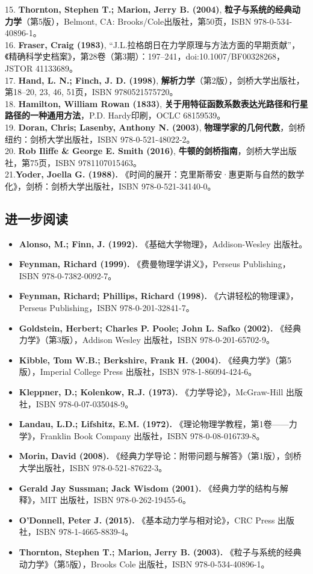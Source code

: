 15. \textbf{Thornton, Stephen T.; Marion, Jerry B. (2004)}, \textbf{粒子与系统的经典动力学}（第5版），Belmont, CA: Brooks/Cole出版社，第50页，ISBN 978-0-534-40896-1。\\
16. \textbf{Fraser, Craig (1983)}, “J.L.拉格朗日在力学原理与方法方面的早期贡献”，《精确科学史档案》，第28卷（第3期）：197–241，doi:10.1007/BF00328268，JSTOR 41133689。\\
17. \textbf{Hand, L. N.; Finch, J. D. (1998)}, \textbf{解析力学}（第2版），剑桥大学出版社，第18–20, 23, 46, 51页，ISBN 9780521575720。\\
18. \textbf{Hamilton, William Rowan (1833)}, \textbf{关于用特征函数系数表达光路径和行星路径的一种通用方法}，P.D. Hardy印刷，OCLC 68159539。\\
19. \textbf{Doran, Chris; Lasenby, Anthony N. (2003)}, \textbf{物理学家的几何代数}，剑桥纽约：剑桥大学出版社，ISBN 978-0-521-48022-2。\\
20. \textbf{Rob Iliffe & George E. Smith (2016)}, \textbf{牛顿的剑桥指南}，剑桥大学出版社，第75页，ISBN 9781107015463。\\
21.\textbf{Yoder, Joella G. (1988). }《时间的展开：克里斯蒂安·惠更斯与自然的数学化》，剑桥：剑桥大学出版社，ISBN 978-0-521-34140-0。
\subsection{进一步阅读}
\begin{itemize}
\item \textbf{Alonso, M.; Finn, J. (1992).} 《基础大学物理》，Addison-Wesley 出版社。
\item \textbf{Feynman, Richard (1999).} 《费曼物理学讲义》，Perseus Publishing，ISBN 978-0-7382-0092-7。
\item \textbf{Feynman, Richard; Phillips, Richard (1998).} 《六讲轻松的物理课》，Perseus Publishing，ISBN 978-0-201-32841-7。
\item \textbf{Goldstein, Herbert; Charles P. Poole; John L. Safko (2002).} 《经典力学》（第3版），Addison Wesley 出版社，ISBN 978-0-201-65702-9。
\item \textbf{Kibble, Tom W.B.; Berkshire, Frank H. (2004).} 《经典力学》（第5版），Imperial College Press 出版社，ISBN 978-1-86094-424-6。
\item \textbf{Kleppner, D.; Kolenkow, R.J. (1973).} 《力学导论》，McGraw-Hill 出版社，ISBN 978-0-07-035048-9。
\item \textbf{Landau, L.D.; Lifshitz, E.M. (1972).} 《理论物理学教程，第1卷——力学》，Franklin Book Company 出版社，ISBN 978-0-08-016739-8。
\item \textbf{Morin, David (2008).} 《经典力学导论：附带问题与解答》（第1版），剑桥大学出版社，ISBN 978-0-521-87622-3。
\item \textbf{Gerald Jay Sussman; Jack Wisdom (2001).} 《经典力学的结构与解释》，MIT 出版社，ISBN 978-0-262-19455-6。
\item \textbf{O'Donnell, Peter J. (2015).} 《基本动力学与相对论》，CRC Press 出版社，ISBN 978-1-4665-8839-4。
\item \textbf{Thornton, Stephen T.; Marion, Jerry B. (2003).} 《粒子与系统的经典动力学》（第5版），Brooks Cole 出版社，ISBN 978-0-534-40896-1。
\end{itemize}